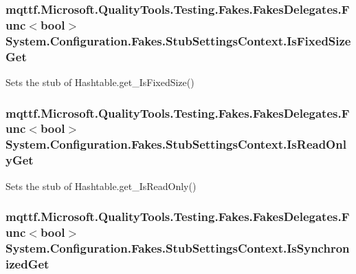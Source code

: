 \hypertarget{class_system_1_1_configuration_1_1_fakes_1_1_stub_settings_context_abd3d931fa1ae8bec903c9a79a6dc5da9}{
\subsubsection[{Is\-Fixed\-Size\-Get}]{\setlength{\rightskip}{0pt plus 5cm}mqttf.\-Microsoft.\-Quality\-Tools.\-Testing.\-Fakes.\-Fakes\-Delegates.\-Func$<$bool$>$ System.\-Configuration.\-Fakes.\-Stub\-Settings\-Context.\-Is\-Fixed\-Size\-Get}}\label{class_system_1_1_configuration_1_1_fakes_1_1_stub_settings_context_abd3d931fa1ae8bec903c9a79a6dc5da9}


Sets the stub of Hashtable.\-get\-\_\-\-Is\-Fixed\-Size()

\hypertarget{class_system_1_1_configuration_1_1_fakes_1_1_stub_settings_context_ad08b14f2a5856269b428c6ee0331d5f5}{
\subsubsection[{Is\-Read\-Only\-Get}]{\setlength{\rightskip}{0pt plus 5cm}mqttf.\-Microsoft.\-Quality\-Tools.\-Testing.\-Fakes.\-Fakes\-Delegates.\-Func$<$bool$>$ System.\-Configuration.\-Fakes.\-Stub\-Settings\-Context.\-Is\-Read\-Only\-Get}}\label{class_system_1_1_configuration_1_1_fakes_1_1_stub_settings_context_ad08b14f2a5856269b428c6ee0331d5f5}


Sets the stub of Hashtable.\-get\-\_\-\-Is\-Read\-Only()

\hypertarget{class_system_1_1_configuration_1_1_fakes_1_1_stub_settings_context_aff4504d5041e2ecac7730b469f13e00e}{
\subsubsection[{Is\-Synchronized\-Get}]{\setlength{\rightskip}{0pt plus 5cm}mqttf.\-Microsoft.\-Quality\-Tools.\-Testing.\-Fakes.\-Fakes\-Delegates.\-Func$<$bool$>$ System.\-Configuration.\-Fakes.\-Stub\-Settings\-Context.\-Is\-Synchronized\-Get}}\label{class_system_1_1_configuration_1_1_fakes_1_1_stub_settings_context_aff4504d5041e2ecac7730b469f13e00e}


